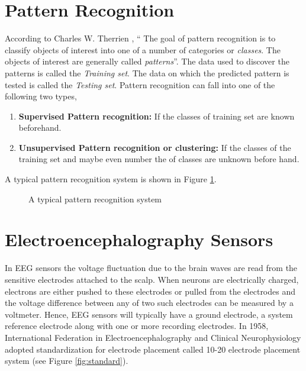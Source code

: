 \section{Pattern Recognition}
	According to Charles W. Therrien \cite{Therrien:1989:DEC:61950}, `` The goal of pattern recognition is to classify objects of interest into one of a number of categories or \textit{classes}. The objects of interest are generally called \textit{patterns}''. The data used to discover the patterns is called the \textit{Training set}. The data on which the predicted pattern is tested is called the \textit{Testing set}. Pattern recognition can fall into one of the following two types,
    
    \begin{enumerate}
		\item \textbf{Supervised Pattern recognition:} If the classes of training set are known beforehand.
        \item \textbf{Unsupervised Pattern recognition or clustering:} If the classes of the training set and maybe even number the of classes are unknown before hand.
	\end{enumerate}
    
    A typical pattern recognition system is shown in Figure \ref{fig:pattern_pipeline}.
    \begin{figure}[hbtp]
        \centering
        \caption{A typical pattern recognition system}
        \label{fig:pattern_pipeline}
    \end{figure}

    
\section{Electroencephalography Sensors}
\label{Electroencephalography Sensors}
	In EEG sensors the voltage fluctuation due to the brain waves are read from the sensitive electrodes attached to the scalp. When neurons are electrically charged, electrons are either pushed to these electrodes or pulled from the electrodes and the voltage difference between any of two such electrodes can be measured by a voltmeter. Hence, EEG sensors will typically have a ground electrode, a system reference electrode along with one or more recording electrodes. In 1958, International Federation in Electroencephalography and Clinical Neurophysiology adopted standardization for electrode placement called 10-20 electrode placement system \cite{H.H.Jasper} (see Figure \ref{fig:standard}).

